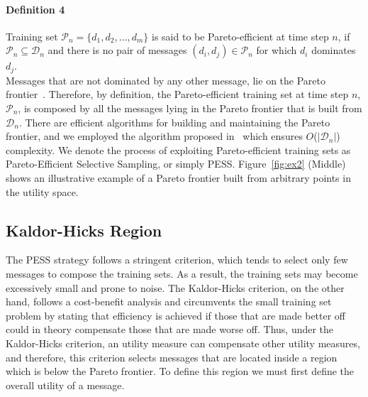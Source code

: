 

\paragraph*{\bf{Definition 4}} Training set $\mathcal{P}_n=\{d_1, d_2, \ldots, d_m\}$ is said to be Pareto-efficient at time step $n$, if $\mathcal{P}_n\subseteq\mathcal{D}_n$ and there is no pair of messages $(d_i, d_j)\in\mathcal{P}_n$ for which $d_i$ dominates $d_j$.\\

Messages that are not dominated
by any other message, lie on the Pareto frontier~\cite{palda@book}. Therefore, by definition, the Pareto-efficient training set at time step $n$, $\mathcal{P}_n$, is composed by all the messages lying in the Pareto frontier that is built from $\mathcal{D}_n$.
There are efficient algorithms for building and maintaining the Pareto frontier, and we employed the algorithm proposed in~\cite{operator} which ensures $O$($|\mathcal{D}_n|$) complexity.
We denote the process of exploiting Pareto-efficient training sets as
Pareto-Efficient Selective Sampling, or simply PESS. Figure~\ref{fig:ex2} (Middle) shows an illustrative example of a Pareto frontier built from arbitrary points in the utility space.

\subsection*{Kaldor-Hicks Region}
The PESS strategy follows a stringent criterion, which tends to select only few messages to compose the training sets. As a result, the training sets may become excessively small and prone to noise.
The Kaldor-Hicks criterion, on the other hand,
follows a cost-benefit analysis and circumvents the
small training set problem by stating that efficiency is achieved if
those that are made better off could in theory compensate those that are made worse off. Thus, under the Kaldor-Hicks criterion, an utility measure can compensate other utility measures, and therefore, this criterion selects messages that are located inside a region which is below the Pareto frontier. To define this region we must first define the overall utility of a message.

